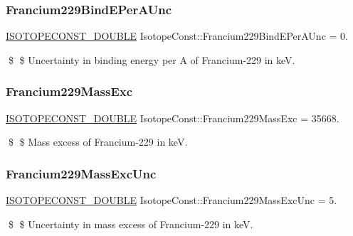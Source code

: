 \subsubsection{\texorpdfstring{Francium229\+Bind\+E\+Per\+A\+Unc}{Francium229BindEPerAUnc}}
{\footnotesize\ttfamily \mbox{\hyperlink{group___isotope_const-_macros_ga8f45a7272ce02c0b4c65c44636ed719a}{I\+S\+O\+T\+O\+P\+E\+C\+O\+N\+S\+T\+\_\+\+D\+O\+U\+B\+LE}} Isotope\+Const\+::\+Francium229\+Bind\+E\+Per\+A\+Unc = 0.}

\$ \$ Uncertainty in binding energy per A of Francium-\/229 in keV. \mbox{\label{group___isotope_const-_francium-_fr229_gaa13818e3816b44fa4657ca8be93376ed}} 
\subsubsection{\texorpdfstring{Francium229\+Mass\+Exc}{Francium229MassExc}}
{\footnotesize\ttfamily \mbox{\hyperlink{group___isotope_const-_macros_ga8f45a7272ce02c0b4c65c44636ed719a}{I\+S\+O\+T\+O\+P\+E\+C\+O\+N\+S\+T\+\_\+\+D\+O\+U\+B\+LE}} Isotope\+Const\+::\+Francium229\+Mass\+Exc = 35668.}

\$ \$ Mass excess of Francium-\/229 in keV. \mbox{\label{group___isotope_const-_francium-_fr229_gafcd50fffd4fb09cceb72fc48b23278bc}} 
\subsubsection{\texorpdfstring{Francium229\+Mass\+Exc\+Unc}{Francium229MassExcUnc}}
{\footnotesize\ttfamily \mbox{\hyperlink{group___isotope_const-_macros_ga8f45a7272ce02c0b4c65c44636ed719a}{I\+S\+O\+T\+O\+P\+E\+C\+O\+N\+S\+T\+\_\+\+D\+O\+U\+B\+LE}} Isotope\+Const\+::\+Francium229\+Mass\+Exc\+Unc = 5.}

\$ \$ Uncertainty in mass excess of Francium-\/229 in keV. \mbox{\label{group___isotope_const-_francium-_fr229_ga444732277afdec0bb2c288ef975a26ff}} 
